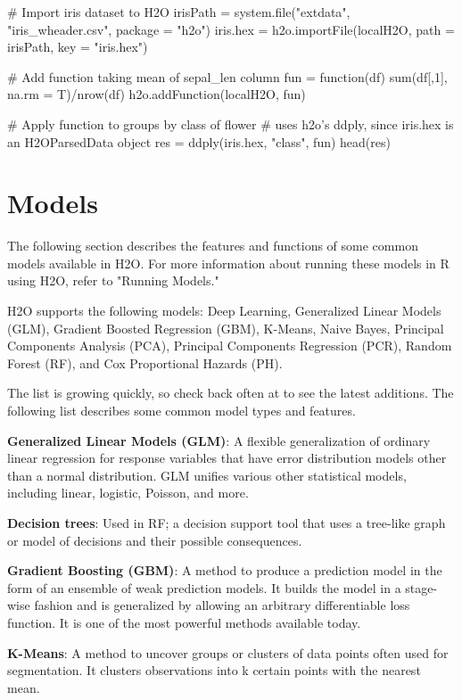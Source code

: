 \documentclass[11pt]{article}
\begin{document}
\begin{enumerate}
\begin{spverbatim}
# Import iris dataset to H2O
irisPath = system.file("extdata", "iris_wheader.csv", package = "h2o")
iris.hex = h2o.importFile(localH2O, path = irisPath, key = "iris.hex")

# Add function taking mean of sepal_len column
fun = function(df) { sum(df[,1], na.rm = T)/nrow(df) }
h2o.addFunction(localH2O, fun)

# Apply function to groups by class of flower
# uses h2o's ddply, since iris.hex is an H2OParsedData object
res = ddply(iris.hex, "class", fun)
head(res)
\end{spverbatim}


\section{Models}

The following section describes the features and functions of some common models available in H2O.  For more information about running these models in R using H2O, refer to "Running Models." 

H2O supports the following models: Deep Learning, Generalized Linear Models (GLM), Gradient Boosted Regression (GBM), K-Means, Naive Bayes, Principal Components Analysis (PCA), Principal Components Regression (PCR), Random Forest (RF), and Cox Proportional Hazards (PH). 

The list is growing quickly, so check back often at  to see the latest additions. The following list describes some common model types and features. 

\textbf{Generalized Linear Models (GLM)}: A flexible generalization of ordinary linear regression for response variables that have error distribution models other than a normal distribution. GLM unifies various other statistical models, including linear, logistic, Poisson, and more.

\textbf{Decision trees}: Used in RF; a decision support tool that uses a tree-like graph or model of decisions and their possible consequences.

\textbf{Gradient Boosting (GBM)}: A method to produce a prediction model in the form of an ensemble of weak prediction models. It builds the model in a stage-wise fashion and is generalized by allowing an arbitrary differentiable loss function. It is one of the most powerful methods available today.

\textbf{K-Means}: A method to uncover groups or clusters of data points often used for segmentation. It clusters observations into k certain points with the nearest mean.


\end{enumerate}
\end{document}
